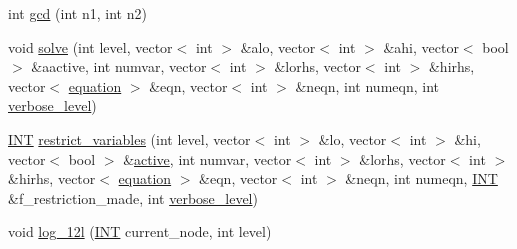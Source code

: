 \begin{DoxyCompactItemize}
\item 
int \mbox{\hyperlink{classmckay_1_1t_m_c_k_a_y_aa021019054cebdfddbdb9e2c18a17635}{gcd}} (int n1, int n2)
\item 
void \mbox{\hyperlink{classmckay_1_1t_m_c_k_a_y_a56834d9ca4b27c64bde14b8b6c1bceee}{solve}} (int level, vector$<$ int $>$ \&alo, vector$<$ int $>$ \&ahi, vector$<$ bool $>$ \&aactive, int numvar, vector$<$ int $>$ \&lorhs, vector$<$ int $>$ \&hirhs, vector$<$ \mbox{\hyperlink{namespacemckay_a4f7cb66ed07fe573b2b08e73ab462c1a}{equation}} $>$ \&eqn, vector$<$ int $>$ \&neqn, int numeqn, int \mbox{\hyperlink{simeon_8_c_a818073fbcc2f439e7c56952f67386122}{verbose\+\_\+level}})
\item 
\mbox{\hyperlink{galois_8h_a09fddde158a3a20bd2dcadb609de11dc}{I\+NT}} \mbox{\hyperlink{classmckay_1_1t_m_c_k_a_y_a5f9cf01a66eebb00e706ac5d5cd900d8}{restrict\+\_\+variables}} (int level, vector$<$ int $>$ \&lo, vector$<$ int $>$ \&hi, vector$<$ bool $>$ \&\mbox{\hyperlink{classmckay_1_1t_m_c_k_a_y_a237e335b7277a08587ce54ee12236963}{active}}, int numvar, vector$<$ int $>$ \&lorhs, vector$<$ int $>$ \&hirhs, vector$<$ \mbox{\hyperlink{namespacemckay_a4f7cb66ed07fe573b2b08e73ab462c1a}{equation}} $>$ \&eqn, vector$<$ int $>$ \&neqn, int numeqn, \mbox{\hyperlink{galois_8h_a09fddde158a3a20bd2dcadb609de11dc}{I\+NT}} \&f\+\_\+restriction\+\_\+made, int \mbox{\hyperlink{simeon_8_c_a818073fbcc2f439e7c56952f67386122}{verbose\+\_\+level}})
\item 
void \mbox{\hyperlink{classmckay_1_1t_m_c_k_a_y_a52c5ffb02df95231c6cdb136c520c6c8}{log\+\_\+12l}} (\mbox{\hyperlink{galois_8h_a09fddde158a3a20bd2dcadb609de11dc}{I\+NT}} current\+\_\+node, int level)
\end{DoxyCompactItemize}
